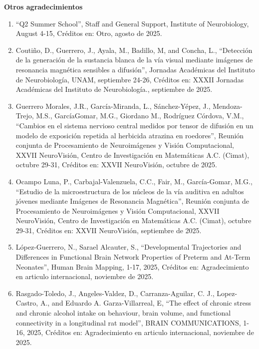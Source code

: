 \textbf{Otros agradecimientos}

\begin{enumerate}

\item “Q2 Summer School”, Staff and General Support, Institute of Neurobiology, August 4-15, Créditos en: Otro, agosto de 
2025.

\item  Coutiño, D., Guerrero, J., Ayala, M., Badillo, M, and Concha, L., “Detección de la generación de la sustancia blanca 
de la 
vía visual mediante imágenes de resonancia magnética sensibles a difusión”, Jornadas Académicas del Instituto de 
Neurobiología, UNAM, septiembre 24-26, Créditos en: XXXII Jornadas Académicas del Instituto de Neurobiología., septiembre de 
2025.

\item  Guerrero Morales, J.R., García-Miranda, L., Sánchez-Yépez, J., Mendoza-Trejo, M.S., GarcíaGomar, M.G., Giordano M., 
Rodríguez Córdova, V.M., “Cambios en el sistema nervioso central medidos por tensor de difusión en un modelo de exposición 
repetida al herbicida atrazina en roedores”, Reunión conjunta de Procesamiento de Neuroimágenes y Visión Computacional, XXVII 
NeuroVisión, Centro de Investigación en Matemáticas A.C. (Cimat), octubre 29-31, Créditos en: XXVII NeuroVisión, octubre de 
2025.

\item  Ocampo Luna, P., Carbajal-Valenzuela, C.C., Fair, M., García-Gomar, M.G., “Estudio de la microestructura de los 
núcleos de 
la vía auditiva en adultos jóvenes mediante Imágenes de Resonancia Magnética”, Reunión conjunta de Procesamiento de 
Neuroimágenes y Visión Computacional, XXVII NeuroVisión, Centro de Investigación en Matemáticas A.C. (Cimat), octubre 29-31, 
Créditos en: XXVII NeuroVisión, septiembre de 2025.

\item  López-Guerrero, N., Sarael Alcauter, S., “Developmental Trajectories and Differences in Functional Brain Network 
Properties of Preterm and At-Term Neonates”, Human Brain Mapping, 1-17, 2025, Créditos en: Agradecimiento en articulo 
internacional, noviembre de 2025.

\item  Rasgado-Toledo, J., Angeles-Valdez, D., Carranza-Aguilar, C. J., Lopez-Castro, A., and Eduardo A. Garza-Villarreal, E, 
“The effect of chronic stress and chronic alcohol intake on behaviour, brain volume, and functional connectivity in a 
longitudinal rat model”, BRAIN COMMUNICATIONS, 1-16, 2025, Créditos en: Agradecimiento en articulo internacional, noviembre 
de 2025.


\end{enumerate}
